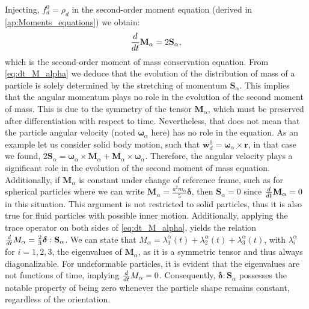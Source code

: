 Injecting, $f_d^0 = \rho_d$ in the second-order moment equation (derived in \ref{ap:Moments_equations}) we obtain:
\begin{equation}
    \ddt {\textbf{M}_\alpha}=2\textbf{S}_\alpha, 
    \label{eq:dt_M_alpha}
\end{equation}
which is the second-order moment of mass conservation equation. 
From \ref{eq:dt_M_alpha} we deduce that the evolution of the distribution of mass of a particle is solely determined by the stretching of momentum $\textbf{S}_\alpha$. 
This implies that the angular momentum plays no role in the evolution of the second moment of mass. 
This is due to the symmetry of the tensor $\textbf{M}_\alpha$, which must be preserved after differentiation with respect to time.
Nevertheless, that does not mean that the particle angular velocity (noted $\bm\omega_\alpha$ here) has no role in the equation. 
As an example let us consider solid body motion, such that $\textbf{w}_d^0 = \bm\omega_\alpha \times \textbf{r}$, in that case we found, $2\textbf{S}_\alpha = \bm\omega_\alpha \times \textbf{M}_\alpha+ \textbf{M}_\alpha\times \bm\omega_\alpha $. 
Therefore, the angular velocity plays a significant role in the evolution of the second moment of mass equation. 
Additionally, if $\textbf{M}_\alpha$ is constant under change of reference frame, such as for spherical particles where we can write $\textbf{M}_\alpha= \frac{a^2 m_\alpha}{5} \bm\delta$, then $\textbf{S}_\alpha=0$ since $\frac{d}{dt} \textbf{M}_\alpha = 0$ in this situation.
This argument is not restricted to solid particles, thus it is also true for fluid particles with possible inner motion. 
Additionally, applying the trace operator on both sides of \ref{eq:dt_M_alpha}, yields the relation $\frac{d}{dt} {M_\alpha}=\frac{2}{3}\bm\delta : \textbf{S}_\alpha$.
We can state that $M_\alpha = \lambda^\alpha_1(t)+\lambda^\alpha_2(t)+\lambda^\alpha_3(t)$, with $\lambda_i^\alpha$ for $i=1,2,3$, the eigenvalues of $\textbf{M}_\alpha$, as it is a symmetric tensor and thus always diagonalizable.
For undeformable particles, it is evident that the eigenvalues are not functions of time, implying $\frac{d}{dt} M_\alpha = 0$.  
Consequently, $\bm\delta : \textbf{S}_\alpha$ possesses the notable property of being zero whenever the particle shape remains constant, regardless of the orientation.

